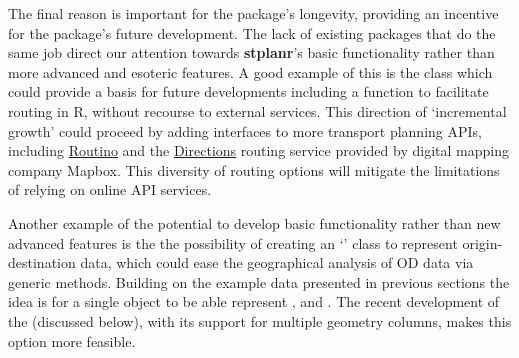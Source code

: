 The final reason is important for the package's longevity, providing an incentive for the package's future development.
The lack of existing packages that do the same job direct our attention towards \textbf{stplanr}'s basic functionality rather than more advanced and esoteric features.
A good example of this is the  class which could provide a basis for future developments including a  function to facilitate routing in R, without recourse to external services.
This direction of `incremental growth' could proceed by adding interfaces to more transport planning APIs, including \href{https://www.routino.org/uk/}{Routino} and the \href{https://www.mapbox.com/directions/}{Directions} routing service provided by digital mapping company Mapbox.
This diversity of routing options will mitigate the limitations of relying on online API services.

Another example of the potential to develop basic functionality rather than new advanced features is the the possibility of creating an `' class to represent origin-destination data, which could ease the geographical analysis of OD data via generic methods.
Building on the example data presented in previous sections the idea is for a single  object to be able represent ,  and .
The recent development of the  (discussed below), with its support for multiple geometry columns, makes this option more feasible.

